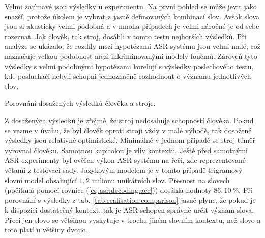 Velmi zajímavé jsou výsledky u  experimentu. Na první pohled se může jevit jako snazší, protože úkolem je vybrat z jasně definovaných kombinací slov. Avšak slova jsou si akusticky velmi podobná a v mnoha případech je velmi náročné je od sebe rozeznat. Jak člověk, tak stroj, dosáhli v tomto testu nejhorších výsledků. Při analýze se ukázalo, že rozdíly mezi hypotézami ASR systému jsou velmi malé, což naznačuje velkou podobnost mezi inkriminovanými modely fonémů. Zároveň tyto výsledky s velmi podobnými hypotézami korelují s výsledky poslechového testu, kde posluchači nebyli schopni jednoznačně rozhodnout o významu jednotlivých slov.

\begin{table}[htpb]
  \centering
  \def\arraystretch{1.5}
  \caption{Porovnání dosažených výsledků člověka a stroje.}
  \label{tab:realisation:comparison}
\end{table}

Z dosažených výsledků je zřejmé, že stroj nedosahuje schopností člověka. Pokud se vezme v úvahu, že byl člověk oproti stroji vždy v malé výhodě, tak dosažené výsledky jsou relativně optimistické. Minimálně v jednom případě se stroj téměř vyrovnal člověku. Samotnou kapitolou je vliv kontextu. Ještě před samotnými ASR experimenty byl ověřen výkon ASR systému na  řeči, zde reprezentované větami z testovací sady. Jazykovým modelem je v tomto případě trigramový slovní model obsahující $1,2$ milionu unikátních slov. Přesnost na slovech (počítaná pomocí rovnice (\ref{eq:asr:decoding:acc})) dosáhla hodnoty $86,10\ \%$. Při porovnání s výsledky z tab. \ref{tab:realisation:comparison} jasně plyne, že pokud je k dispozici dostatečný kontext, tak je ASR schopen správně určit význam slova. Přeci jen slovo  se většinou vyskytuje v trochu jiném slovním kontextu, než slovo  a toto platí u většiny dvojic.
